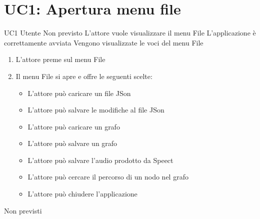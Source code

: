 \documentclass[../AnalisideiRequisiti.tex]{subfiles}
\begin{document}
	\section{UC1: Apertura menu file}
	\UserCase
	{UC1}
	{Utente}
	{Non previsto}
	{L'attore vuole visualizzare il menu File}
	{L'applicazione è correttamente avviata }
	{Vengono visualizzate le voci del menu File}
	{	\begin{enumerate}
			\item{} L'attore preme sul menu File
			\item{} Il menu File si apre e offre le seguenti scelte:
		\begin{itemize}
		\item{} L'attore può caricare un file JSon 
		\item{} L'attore può salvare le modifiche al file JSon 
		\item{} L'attore può caricare un grafo 
		\item{} L'attore può salvare un grafo 
		\item{} L'attore può salvare l'audio prodotto da Speect 
		\item{} L'attore può cercare il percorso di un nodo nel grafo 
		\item{} L'attore può chiudere l'applicazione 
		\end{itemize}
	\end{enumerate}
	}
	{Non previsti}
\end{document}
